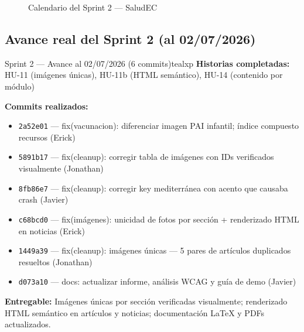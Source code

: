 \documentclass[12pt, a4paper]{article}
\begin{document}
\begin{figure}[H]
\caption{Calendario del Sprint 2 --- SaludEC}
\end{figure}

\subsection{Avance real del Sprint 2 (al 02/07/2026)}

\begin{iterbox}{Sprint 2 --- Avance al 02/07/2026 (6 commits)}{tealxp}
\textbf{Historias completadas:} HU-11 (imágenes únicas), HU-11b (HTML semántico), HU-14 (contenido por módulo)

\textbf{Commits realizados:}
\begin{itemize}
  \item \texttt{2a52e01} --- fix(vacunacion): diferenciar imagen PAI infantil; índice compuesto recursos (Erick)
  \item \texttt{5891b17} --- fix(cleanup): corregir tabla de imágenes con IDs verificados visualmente (Jonathan)
  \item \texttt{8fb86e7} --- fix(cleanup): corregir key mediterránea con acento que causaba crash (Javier)
  \item \texttt{c68bcd0} --- fix(imágenes): unicidad de fotos por sección + renderizado HTML en noticias (Erick)
  \item \texttt{1449a39} --- fix(cleanup): imágenes únicas --- 5 pares de artículos duplicados resueltos (Jonathan)
  \item \texttt{d073a10} --- docs: actualizar informe, análisis WCAG y guía de demo (Javier)
\end{itemize}

\textbf{Entregable:} Imágenes únicas por sección verificadas visualmente; renderizado HTML semántico en artículos y noticias; documentación LaTeX y PDFs actualizados.
\end{iterbox}
\end{document}
